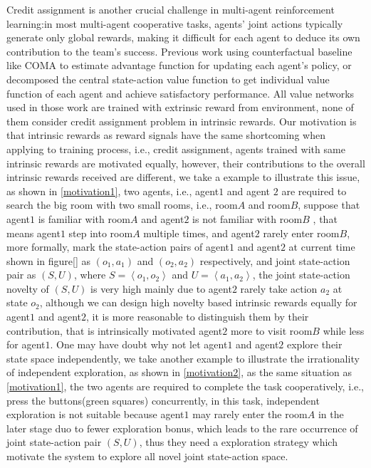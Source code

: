 \documentclass{article} %
\begin{document}
Credit assignment is another crucial challenge in multi-agent reinforcement learning:in most multi-agent cooperative tasks, agents' joint actions typically generate only global rewards, making it difficult for each agent to deduce its own contribution to the team's success. Previous work using counterfactual baseline like COMA\cite{COMA} to estimate advantage function for updating each agent's policy, or decomposed the central state-action value function to get individual value function of each agent and achieve satisfactory performance\cite{VDN,QMIX}. All value networks used in those work are trained with extrinsic reward from environment, none of them consider credit assignment problem in intrinsic rewards. Our motivation is that intrinsic rewards as reward signals have the same shortcoming when applying to training process, i.e., credit assignment, agents trained with same intrinsic rewards are motivated equally, however, their contributions to the overall intrinsic rewards received are different, we take a example to illustrate this issue, as shown in \ref{motivation1}, two agents, i.e., agent$1$ and agent $2$ are required to search the big room with two small rooms, i.e., room$A$ and room$B$, suppose that agent$1$ is familiar with room$A$ and agent$2$ is not familiar with room$B$ , that means agent$1$ step into room$A$ multiple times, and agent$2$ rarely enter room$B$, more formally, mark the state-action pairs of agent$1$ and agent$2$ at current time shown in figure[] as $\left(o_{1}, a_{1}\right)$ and $\left(o_{2}, a_{2}\right)$ respectively, and joint state-action pair as $(S, U)$, where $S=\left\langle o_{1}, o_{2}\right\rangle$ and $U=\left\langle a_{1}, a_{2}\right\rangle$, the joint state-action novelty of $(S, U)$ is very high mainly due to agent$2$ rarely take action $a_{2}$ at state $o_{2}$, although we can design high novelty based intrinsic rewards equally for agent$1$ and agent$2$, it is more reasonable to distinguish them by their contribution, that is intrinsically motivated agent$2$ more to visit room$B$ while less for agent$1$. One may have doubt why not let agent$1$ and agent$2$ explore their state space independently, we take another example to illustrate the irrationality of independent exploration, as shown in \ref{motivation2}, as the same situation as \ref{motivation1}, the two agents are required to complete the task cooperatively, i.e., press the buttons(green squares) concurrently, in this task, independent exploration is not suitable because agent$1$ may rarely enter the room$A$ in the later stage duo to fewer exploration bonus, which leads to the rare occurrence of joint state-action pair $(S, U)$, thus they need a exploration strategy which motivate the system to explore all novel joint state-action space.
\end{document}
